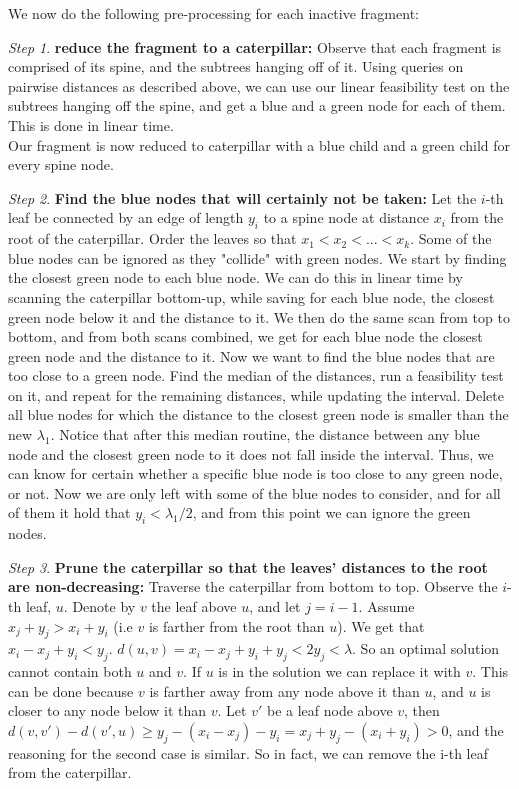\documentclass[11pt,a4paper]{article}
\theoremstyle{definition}
\theoremstyle{remark}
\newtheorem{step}{Step}[section]
\begin{document}
We now do the following pre-processing for each inactive fragment:
\begin{step}
\textbf{reduce the fragment to a caterpillar:}
Observe that each fragment is comprised of its spine, and the subtrees hanging off of it. Using queries on pairwise distances as described above, we can use our linear feasibility test on the subtrees hanging off the spine, and get a blue and a green node for each of them. This is done in linear time.\\
Our fragment is now reduced to caterpillar with a blue child and a green child for every spine node.
\end{step}
\begin{step}\label{removing green nodes}
\textbf{Find the blue nodes that will certainly not be taken:}
Let the $i$-th leaf be connected by an edge of length $y_i$ to a spine node at distance $x_i$ from the root of the caterpillar. Order the leaves so that $x_1 < x_2 < ... < x_k$.
Some of the blue nodes can be ignored as they "collide" with green nodes. We start by finding the closest green node to each blue node. We can do this in linear time by scanning the caterpillar bottom-up, while saving for each blue node, the closest green node below it and the distance to it. We then do the same scan from top to bottom, and from both scans combined, we get for each blue node the closest green node and the distance to it. Now we want to find the blue nodes that are too close to a green node. Find the median of the distances, run a feasibility test on it, and repeat for the remaining distances, while updating the interval. Delete all blue nodes for which the distance to the closest green node is smaller than the new $\lambda_1$. Notice that after this median routine, the distance between any blue node and the closest green node to it does not fall inside the interval. Thus, we can know for certain whether a specific blue node is too close to any green node, or not.
Now we are only left with some of the blue nodes to consider, and for all of them it hold that $y_i < \lambda_1/2$, and from this point we can ignore the green nodes.
\end{step}
\begin{step}
\textbf{Prune the caterpillar so that the leaves' distances to the root are non-decreasing:}
Traverse the caterpillar from bottom to top. Observe the $i$-th leaf, $u$. Denote by $v$ the leaf above $u$, and let  $j=i-1$. Assume $x_j+y_j > x_i+y_i$ (i.e $v$ is farther from the root than $u$). We get that $x_i-x_j+y_i < y_j$. $d(u,v) = x_i-x_j+y_i+y_j < 2y_j < \lambda$. So an optimal solution cannot contain both $u$ and $v$. If $u$ is in the solution we can replace it with $v$. This can be done because $v$ is farther away from any node above it than $u$, and $u$ is closer to any node below it than $v$. Let $v'$ be a leaf node above $v$, then $d(v,v') - d(v',u) \geq y_j-(x_i-x_j)-y_i = x_j+y_j-(x_i+y_i) > 0$, and the reasoning for the second case is similar.
So in fact, we can remove the i-th leaf from the caterpillar.
\end{step}
\end{document}
